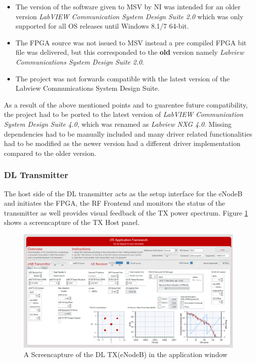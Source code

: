\begin{itemize}
    \item The version of the software given to MSV by NI was intended for an older version \textit{LabVIEW Communication System Design Suite 2.0} which was only supported for all OS releases until Windows 8.1/7 64-bit.

    \item The FPGA source was not issued to MSV instead a pre compiled FPGA bit file was delivered, but this corresponded to the \textbf{old} version namely \textit{Labview Communications System Design Suite 2.0}.

    \item The project was not forwards compatible with the latest version of the Labview Communications System Design Suite.
\end{itemize}

As a result of the above mentioned points and to guarentee future compatibility, the project had to be ported to the latest version of \textit{LabVIEW Communication System Design Suite 4.0}, which was renamed as \textit{Labview NXG 4.0}. Missing dependencies had to be manually included and many driver related functionalities had to be modified as the newer version had a different driver implementation compared to the older version.

\subsubsection{DL Transmitter}\label{ssec:LTEAFWTXOptions}

The host side of the DL transmitter acts as the setup interface for the eNodeB and initiates the FPGA, the RF Frontend and monitors the status of the transmitter as well provides visual feedback of the TX power spectrum. Figure \ref{fig:DLRXAdvScreen} shows a screencapture of the TX Host panel.


\begin{figure}[H]
    \centering
    \includegraphics[width=\linewidth]{images/SISORXADVEdited.png}
    \caption{A Screencapture of the DL TX(eNodeB) in the application window}
    \label{fig:DLRXAdvScreen}
\end{figure}

